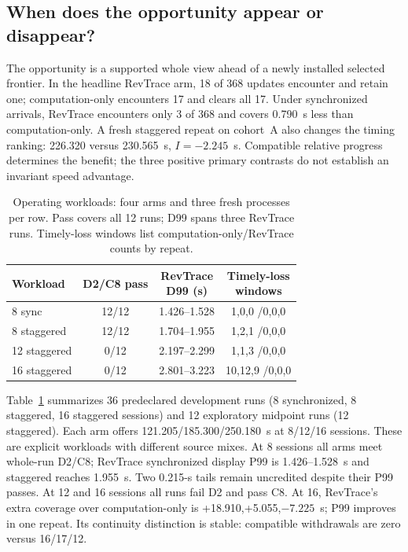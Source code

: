 \subsection{When does the opportunity appear or disappear?}
The opportunity is a supported whole view ahead of a newly installed
selected frontier. In the headline RevTrace arm, 18 of 368 updates encounter
and retain one; computation-only encounters 17 and clears all 17. Under
synchronized arrivals, RevTrace encounters only 3 of 368 and covers 0.790~s
less than computation-only. A fresh staggered repeat on cohort~A also
changes the timing ranking: 226.320 versus 230.565~s, $I=-2.245$~s.
Compatible relative progress determines the benefit; the three positive
primary contrasts do not establish an invariant speed advantage.

\begin{table}[t]
\centering
\caption{Operating workloads: four arms and three fresh processes per row.
Pass covers all 12 runs; D99 spans three RevTrace runs. Timely-loss windows
list computation-only/RevTrace counts by repeat.}
\label{tab:operating_workloads}
\small\setlength{\tabcolsep}{3pt}
\begin{tabular}{@{}lccc@{}}
\toprule
Workload & D2/C8 pass & \shortstack{RevTrace\\D99 (s)} &
\shortstack{Timely-loss\\windows}\\
\midrule
8 sync &12/12 &1.426--1.528 &1,0,0 /0,0,0\\
8 staggered &12/12 &1.704--1.955 &1,2,1 /0,0,0\\
12 staggered &0/12 &2.197--2.299 &1,1,3 /0,0,0\\
16 staggered &0/12 &2.801--3.223 &10,12,9 /0,0,0\\
\bottomrule
\end{tabular}
\end{table}

Table~\ref{tab:operating_workloads} summarizes 36 predeclared development
runs (8 synchronized, 8 staggered, 16 staggered sessions) and 12 exploratory
midpoint runs (12 staggered). Each arm offers 121.205/185.300/250.180~s
at 8/12/16 sessions. These are explicit workloads with different source
mixes. At 8 sessions all arms meet whole-run D2/C8; RevTrace synchronized
display P99 is 1.426--1.528~s and staggered reaches 1.955~s. Two 0.215-s
tails remain uncredited despite their P99 passes. At 12 and 16 sessions
all runs fail D2 and pass C8. At 16, RevTrace's extra coverage over
computation-only is +18.910,+5.055,$-7.225$~s; P99 improves in one repeat.
Its continuity distinction is stable: compatible withdrawals are zero
versus 16/17/12.

